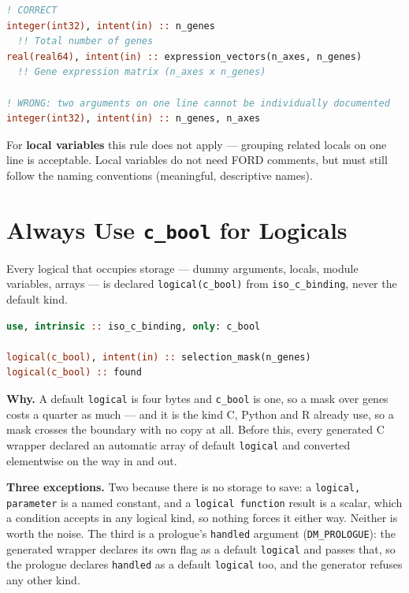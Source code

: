 \documentclass{article}
\begin{document}
\begin{lstlisting}[language=Fortran]
! CORRECT
integer(int32), intent(in) :: n_genes
  !! Total number of genes
real(real64), intent(in) :: expression_vectors(n_axes, n_genes)
  !! Gene expression matrix (n_axes x n_genes)

! WRONG: two arguments on one line cannot be individually documented
integer(int32), intent(in) :: n_genes, n_axes
\end{lstlisting}

For \textbf{local variables} this rule does not apply — grouping related locals on one line is acceptable. Local variables do not need FORD comments, but must still follow the naming conventions (meaningful, descriptive names).

\section{Always Use \texttt{c\_bool} for Logicals}

Every logical that occupies storage --- dummy arguments, locals, module variables, arrays ---
is declared \texttt{logical(c\_bool)} from \texttt{iso\_c\_binding}, never the default kind.

\begin{lstlisting}[language=Fortran]
use, intrinsic :: iso_c_binding, only: c_bool

logical(c_bool), intent(in) :: selection_mask(n_genes)
logical(c_bool) :: found
\end{lstlisting}

\textbf{Why.} A default \texttt{logical} is four bytes and \texttt{c\_bool} is one, so a mask
over genes costs a quarter as much --- and it is the kind C, Python and R already use, so a
mask crosses the boundary with no copy at all. Before this, every generated C wrapper declared
an automatic array of default \texttt{logical} and converted elementwise on the way in and out.

\textbf{Three exceptions.} Two because there is no storage to save: a \texttt{logical,
parameter} is a named constant, and a \texttt{logical function} result is a scalar, which a
condition accepts in any logical kind, so nothing forces it either way. Neither is worth the
noise. The third is a prologue's \texttt{handled} argument (\texttt{DM\_PROLOGUE}): the generated
wrapper declares its own flag as a default \texttt{logical} and passes that, so the prologue
declares \texttt{handled} as a default \texttt{logical} too, and the generator refuses any other
kind.
\end{document}
